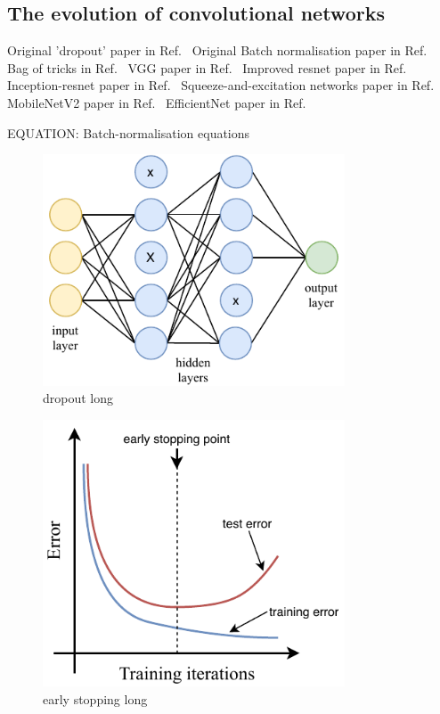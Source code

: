 \subsection{The evolution of convolutional networks} %
\label{sec:cvn_theory_architectures} %

Original 'dropout' paper in Ref.~\cite{hinton2012}
Original Batch normalisation paper in Ref.~\cite{ioffe2015}
Bag of tricks in Ref.~\cite{he2018}
VGG paper in Ref.~\cite{simonyan2014}
Improved resnet paper in Ref.~\cite{he2016}
Inception-resnet paper in Ref.~\cite{szegedy2016}
Squeeze-and-excitation networks paper in Ref.~\cite{hu2017}
MobileNetV2 paper in Ref.~\cite{sandler2018}
EfficientNet paper in Ref.~\cite{tan2019}

EQUATION: Batch-normalisation equations

\begin{figure} %
    \includegraphics[width=0.8\textwidth]{diagrams/7-cvn/dropout.pdf}
    \caption[dropout short]
    {dropout long}
    \label{fig:dropout}
\end{figure}

\begin{figure} %
    \includegraphics[width=0.8\textwidth]{diagrams/7-cvn/early_stopping.pdf}
    \caption[early stopping short]
    {early stopping long}
    \label{fig:early_stopping}
\end{figure}

